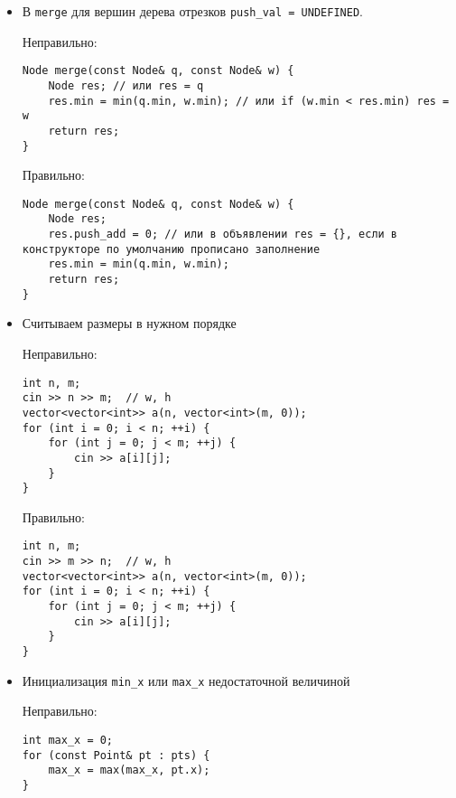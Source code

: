\begin{itemize}
\item В \texttt{merge} для вершин дерева отрезков \texttt{push\_val = UNDEFINED}.

Неправильно:

\begin{verbatim}
Node merge(const Node& q, const Node& w) {
    Node res; // или res = q
    res.min = min(q.min, w.min); // или if (w.min < res.min) res = w
    return res;
}
\end{verbatim}

Правильно:

\begin{verbatim}
Node merge(const Node& q, const Node& w) {
    Node res;
    res.push_add = 0; // или в объявлении res = {}, если в конструкторе по умолчанию прописано заполнение
    res.min = min(q.min, w.min);
    return res;
}
\end{verbatim}

\item Считываем размеры в нужном порядке

Неправильно:

\begin{verbatim}
int n, m;
cin >> n >> m;  // w, h
vector<vector<int>> a(n, vector<int>(m, 0));
for (int i = 0; i < n; ++i) {
    for (int j = 0; j < m; ++j) {
        cin >> a[i][j];
    }
}
\end{verbatim}

Правильно:

\begin{verbatim}
int n, m;
cin >> m >> n;  // w, h
vector<vector<int>> a(n, vector<int>(m, 0));
for (int i = 0; i < n; ++i) {
    for (int j = 0; j < m; ++j) {
        cin >> a[i][j];
    }
}
\end{verbatim}

\item Инициализация \texttt{min\_x} или \texttt{max\_x} недостаточной величиной

Неправильно:

\begin{verbatim}
int max_x = 0;
for (const Point& pt : pts) {
    max_x = max(max_x, pt.x);
}
\end{verbatim}


\end{itemize}
